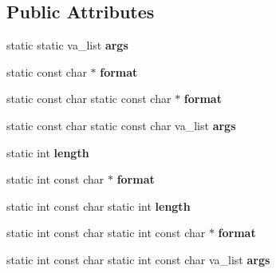 \subsection*{Public Attributes}
\begin{DoxyCompactItemize}
\item 
static static va\+\_\+list {\bfseries args}\hypertarget{classv8_1_1base_1_1_o_s_a1a63277c4801c90d2f13e1ff1d4dea64}{}\label{classv8_1_1base_1_1_o_s_a1a63277c4801c90d2f13e1ff1d4dea64}

\item 
static const char $\ast$ {\bfseries format}\hypertarget{classv8_1_1base_1_1_o_s_a2df245594e67255e3331276fb5bdb22d}{}\label{classv8_1_1base_1_1_o_s_a2df245594e67255e3331276fb5bdb22d}

\item 
static const char static const char $\ast$ {\bfseries format}\hypertarget{classv8_1_1base_1_1_o_s_ad48be97874702511e157cb036a1e4828}{}\label{classv8_1_1base_1_1_o_s_ad48be97874702511e157cb036a1e4828}

\item 
static const char static const char va\+\_\+list {\bfseries args}\hypertarget{classv8_1_1base_1_1_o_s_a4f52cade227a1654c2113aa33af7f92b}{}\label{classv8_1_1base_1_1_o_s_a4f52cade227a1654c2113aa33af7f92b}

\item 
static int {\bfseries length}\hypertarget{classv8_1_1base_1_1_o_s_adcf01466ae36305154d61c4b3e7ce924}{}\label{classv8_1_1base_1_1_o_s_adcf01466ae36305154d61c4b3e7ce924}

\item 
static int const char $\ast$ {\bfseries format}\hypertarget{classv8_1_1base_1_1_o_s_a2d3026206a49e6bb2cb4d09d57f86f33}{}\label{classv8_1_1base_1_1_o_s_a2d3026206a49e6bb2cb4d09d57f86f33}

\item 
static int const char static int {\bfseries length}\hypertarget{classv8_1_1base_1_1_o_s_a03a7915adb5028d39c7155f64e5a48be}{}\label{classv8_1_1base_1_1_o_s_a03a7915adb5028d39c7155f64e5a48be}

\item 
static int const char static int const char $\ast$ {\bfseries format}\hypertarget{classv8_1_1base_1_1_o_s_affa1d7ab7b6beba461a75db9d789b72f}{}\label{classv8_1_1base_1_1_o_s_affa1d7ab7b6beba461a75db9d789b72f}

\item 
static int const char static int const char va\+\_\+list {\bfseries args}\hypertarget{classv8_1_1base_1_1_o_s_aaee2d36cf44123a6191a520e702be6c7}{}\label{classv8_1_1base_1_1_o_s_aaee2d36cf44123a6191a520e702be6c7}

\end{DoxyCompactItemize}
